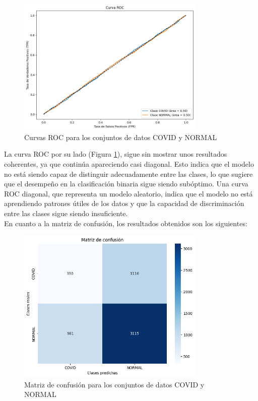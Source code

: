 \documentclass{article}
\begin{document}
	\begin{figure}[h!]
		\centering
		\includegraphics[width=0.8\textwidth]{images/roc2.png}
		\caption{Curvas ROC para los conjuntos de datos COVID y NORMAL}
		\label{fig:roc2}
	\end{figure}

	La curva ROC por su lado (Figura \ref{fig:roc2}), sigue sin mostrar unos resultados coherentes, ya que continúa apareciendo casi diagonal. Esto indica que el modelo no está siendo capaz de distinguir adecuadamente entre las clases, lo que sugiere que el desempeño en la clasificación binaria sigue siendo subóptimo. Una curva ROC diagonal, que representa un modelo aleatorio, indica que el modelo no está aprendiendo patrones útiles de los datos y que la capacidad de discriminación entre las clases sigue siendo insuficiente.
\\

En cuanto a la matriz de confusión, los resultados obtenidos son los siguientes:

	\begin{figure}[h!]
	\centering
	\includegraphics[width=0.8\textwidth]{images/matriz2.png}
	\caption{Matriz de confusión para los conjuntos de datos COVID y NORMAL}
	\label{fig:matriz2}
\end{figure}
\end{document}
